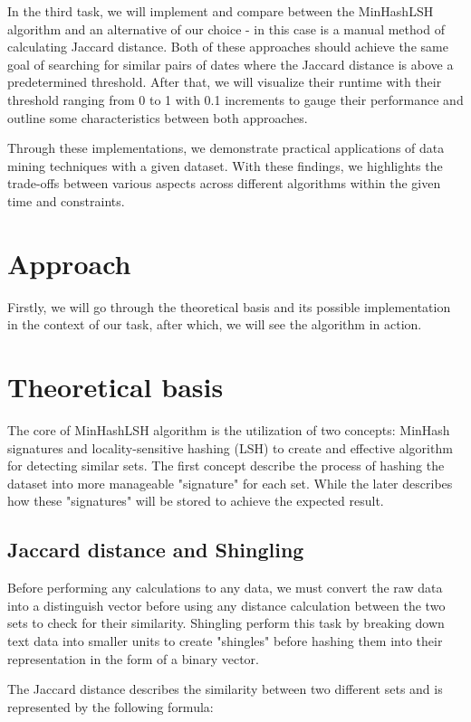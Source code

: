 \documentclass{article}
\begin{document}
In the third task, we will implement and compare between the MinHashLSH algorithm and an alternative of our choice - in this case is a manual method of calculating Jaccard distance. Both of these approaches should achieve the same goal of searching for similar pairs of dates where the Jaccard distance is above a predetermined threshold. After that, we will visualize their runtime with their threshold ranging from 0 to 1 with 0.1 increments to gauge their performance and outline some characteristics between both approaches.

Through these implementations, we demonstrate practical applications of data mining techniques with a given dataset. With these findings, we highlights the trade-offs between various aspects across different algorithms within the given time and constraints.


\section{Approach}
Firstly, we will go through the theoretical basis and its possible implementation in the context of our task, after which, we will see the algorithm in action.

\section{Theoretical basis}
The core of MinHashLSH algorithm is the utilization of two concepts: MinHash signatures and locality-sensitive hashing (LSH) to create and effective algorithm for detecting similar sets. The first concept describe the process of hashing the dataset into more manageable "signature" for each set. While the later describes how these "signatures" will be stored to achieve the expected result.

\subsection{Jaccard distance and Shingling}
Before performing any calculations to any data, we must convert the raw data into a distinguish vector before using any distance calculation between the two sets to check for their similarity. Shingling perform this task by breaking down text data into smaller units to create "shingles" before hashing them into their representation in the form of a binary vector.  

The Jaccard distance describes the similarity between two different sets and is represented by the following formula:
\end{document}
